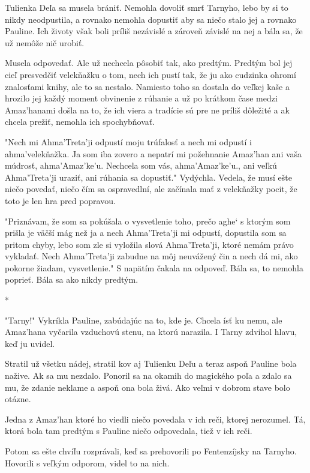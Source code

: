 \documentclass{book}
\begin{document}
Tulienka Deľa sa musela brániť. Nemohla dovoliť smrť Tarnyho, lebo by si to nikdy neodpustila, a rovnako nemohla dopustiť aby sa niečo stalo jej a rovnako Pauline. Ich životy však boli príliš nezávislé a zároveň závislé na nej a bála sa, že už nemôže nič urobiť.

Musela odpovedať. Ale už nechcela pôsobiť tak, ako predtým. Predtým bol jej cieľ presvedčiť velekňažku o tom, nech ich pustí tak, že ju ako cudzinka ohromí znalosťami knihy, ale to sa nestalo. Namiesto toho sa dostala do veľkej kaše a hrozilo jej každý moment obvinenie z rúhanie a už po krátkom čase medzi Amaz'hanami došla na to, že ich viera a tradície sú pre ne príliš dôležité a ak chcela prežiť, nemohla ich spochybňovať.

"$ $Nech mi Ahma'Treta'ji odpustí moju trúfalosť a nech mi odpustí i ahma'velekňažka. Ja som iba zovero a nepatrí mi požehnanie Amaz'han ani vaša múdrosť, ahma'Amaz'ke'u. Nechcela som vás, ahma'Amaz'ke'u., ani veľkú Ahma'Treta'ji uraziť, ani rúhania sa dopustiť."$ $ Vydýchla. Vedela, že musí ešte niečo povedať, niečo čím sa ospravedlní, ale začínala mať z velekňažky pocit, že toto je len hra pred popravou.

"$ $Priznávam, že som sa pokúšala o vysvetlenie toho, prečo aghe‘ s ktorým som prišla je väčší mág než ja a nech Ahma'Treta'ji mi odpustí, dopustila som sa pritom chyby, lebo som zle si vyložila slová Ahma'Treta'ji, ktoré nemám právo vykladať. Nech Ahma'Treta'ji zabudne na môj neuvážený čin a nech dá mi, ako pokorne žiadam, vysvetlenie."$ $ S napätím čakala na odpoveď. Bála sa, to nemohla poprieť. Bála sa ako nikdy predtým.

\begin{center}
*
\end{center}

"$ $Tarny!"$ $ Vykríkla Pauline, zabúdajúc na to, kde je. Chcela ísť ku nemu, ale Amaz'hana vyčarila vzduchovú stenu, na ktorú narazila. I Tarny zdvihol hlavu, keď ju uvidel.

Stratil už všetku nádej, stratil kov aj Tulienku Deľu a teraz aspoň Pauline bola nažive. Ak sa mu nezdalo. Ponoril sa na okamih do magického poľa a zdalo sa mu, že zdanie neklame a aspoň ona bola živá. Ako veľmi v dobrom stave bolo otázne.

Jedna z Amaz'han ktoré ho viedli niečo povedala v ich reči, ktorej nerozumel. Tá, ktorá bola tam predtým s Pauline niečo odpovedala, tiež v ich reči.

Potom sa ešte chvíľu rozprávali, keď sa prehovorili po Fentenzíjsky na Tarnyho. Hovorili s veľkým odporom, videl to na nich.
\end{document}
